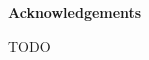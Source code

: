 \vspace*{\fill}
\begin{center}
\textbf{Acknowledgements}
\end{center}

{\color{red}TODO}
\vspace*{\fill}
